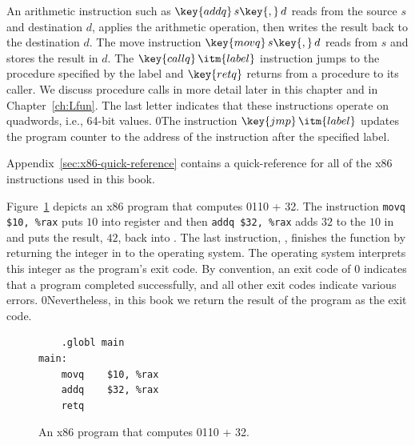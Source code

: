 \documentclass[7x10,nocrop]{TimesAPriori_MIT}%
\def\racketEd{0}
\def\pythonEd{1}
\def\edition{1}
\newcommand{\racket}[1]{{\if\edition\racketEd{#1}\fi}}
\newcommand{\python}[1]{{\if\edition\pythonEd #1\fi}}
\begin{document}
An arithmetic instruction such as $\key{addq}\,s\key{,}\,d$ reads from the
source $s$ and destination $d$, applies the arithmetic operation, then
writes the result back to the destination $d$. 
%
The move instruction $\key{movq}\,s\key{,}\,d$ reads from $s$ and
stores the result in $d$.
%
The $\key{callq}\,\itm{label}$ instruction jumps to the procedure
specified by the label and $\key{retq}$ returns from a procedure to
its caller. 
%
We discuss procedure calls in more detail later in this chapter and in
Chapter~\ref{ch:Lfun}.
%
The last letter  indicates that these instructions operate on
quadwords, i.e., 64-bit values.
%
\racket{The instruction $\key{jmp}\,\itm{label}$ updates the program
  counter to the address of the instruction after the specified
  label.}

Appendix~\ref{sec:x86-quick-reference} contains a quick-reference for
all of the x86 instructions used in this book.

Figure~\ref{fig:p0-x86} depicts an x86 program that computes
\racket{}\python{10 + 32}. The instruction
\lstinline{movq $10, %rax}
puts $10$ into register  and then \lstinline{addq $32, %rax}
adds $32$ to the $10$ in  and
puts the result, $42$, back into .
%
The last instruction, , finishes the  function by
returning the integer in  to the operating system. The
operating system interprets this integer as the program's exit
code. By convention, an exit code of 0 indicates that a program
completed successfully, and all other exit codes indicate various
errors.
%
\racket{Nevertheless, in this book we return the result of the program
  as the exit code.}

\begin{figure}[tbp]
\begin{lstlisting}
	.globl main
main:
	movq	$10, %rax
	addq	$32, %rax
	retq
\end{lstlisting}
\caption{An x86 program that computes
  \racket{}\python{10 + 32}.}
\label{fig:p0-x86}
\end{figure}
\end{document}
